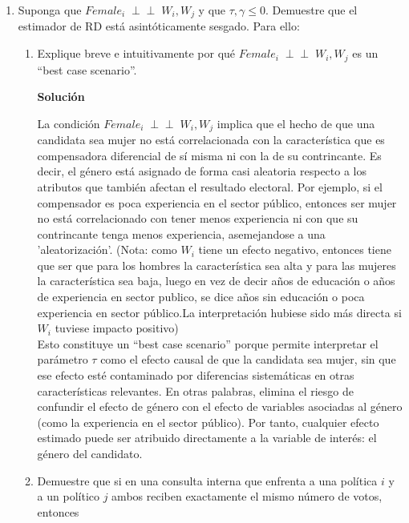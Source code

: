 \documentclass[a4paper, answers, addpoints, 11pt]{exam}
\newcommand{\indep}{\mathrel{\perp\!\!\!\perp}}
\newenvironment{solucion}{%
  \begin{mdframed}[
    backgroundcolor=blue!5,    %
    linecolor=blue!50,          %
    linewidth=2pt,              %
    leftmargin=10pt,            %
    rightmargin=8pt,           %
    topline=true,              %
    bottomline=true,            %
    roundcorner=10pt,           %
    innerleftmargin=10pt,       %
    innerrightmargin=10pt,      %
    innerbottommargin=10pt,     %
    innertopmargin=10pt         %
  ]%
  \begin{tcolorbox}[colframe=blue!50!black, colback=blue!50, coltitle=white, sharp corners=all, boxrule=1mm, width=\textwidth, halign=left, valign=center, top=0mm, bottom=0mm, left=0mm, right=0mm] \textbf{Solución} \end{tcolorbox} }{\end{mdframed}}
\begin{document}
\bigskip

\begin{enumerate}[resume]
    \item Suponga que $Female_i \; \perp\!\!\!\perp \; W_i, W_j$ y que $\tau,\gamma \leq 0$. Demuestre que el estimador de RD está asintóticamente sesgado. Para ello:

    \begin{enumerate}

        \item Explique breve e intuitivamente por qué $Female_i \; \indep \; W_i, W_j$ es un ``best case scenario''.
       \begin{solucion}
La condición $Female_i \; \indep \; W_i, W_j$ implica que el hecho de que una candidata sea mujer no está correlacionada con la característica que es compensadora diferencial de sí misma ni con la de su contrincante. Es decir, el género está asignado de forma casi aleatoria respecto a los atributos que también afectan el resultado electoral. Por ejemplo, si el compensador es poca experiencia en el sector público, entonces ser mujer no está correlacionado con tener menos experiencia ni con que su contrincante tenga menos experiencia, asemejandose a una 'aleatorización'. (Nota: como $W_i$ tiene un efecto negativo, entonces tiene que ser que para los hombres la característica sea alta y para las mujeres la característica sea baja, luego en vez de decir años de educación o años de experiencia en sector publico, se dice años sin educación o poca experiencia en sector público.La interpretación hubiese sido más directa si $W_i$ tuviese impacto positivo)\\

Esto constituye un ``best case scenario'' porque permite interpretar el parámetro $\tau$ como el efecto causal de que la candidata sea mujer, sin que ese efecto esté contaminado por diferencias sistemáticas en otras características relevantes. En otras palabras, elimina el riesgo de confundir el efecto de género con el efecto de variables asociadas al género (como la experiencia en el sector público). Por tanto, cualquier efecto estimado puede ser atribuido directamente a la variable de interés: el género del candidato. 
\end{solucion}
            
        \item Demuestre que si en una consulta interna que enfrenta a una política $i$ y a un político $j$ ambos reciben exactamente el mismo número de votos, entonces


\end{enumerate}
\end{enumerate}
\end{document}
